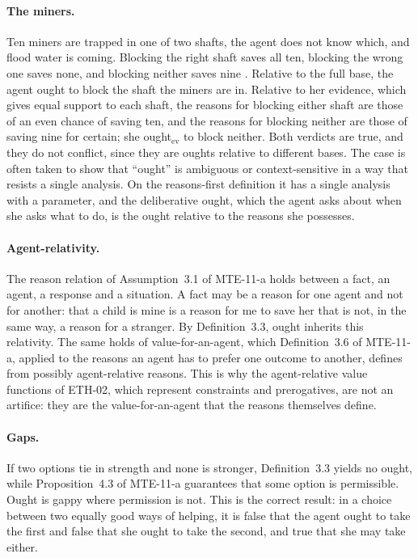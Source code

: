 \documentclass{situationist-preprint}
\begin{document}
\paragraph{The miners.} Ten miners are trapped in one of two shafts, the agent does not know which, and flood water is coming. Blocking the right shaft saves all ten, blocking the wrong one saves none, and blocking neither saves nine \citep{KolodnyMacFarlane2010}. Relative to the full base, the agent ought to block the shaft the miners are in. Relative to her evidence, which gives equal support to each shaft, the reasons for blocking either shaft are those of an even chance of saving ten, and the reasons for blocking neither are those of saving nine for certain; she ought$_{\mathrm{ev}}$ to block neither. Both verdicts are true, and they do not conflict, since they are oughts relative to different bases. The case is often taken to show that \enquote{ought} is ambiguous or context-sensitive in a way that resists a single analysis. On the reasons-first definition it has a single analysis with a parameter, and the deliberative ought, which the agent asks about when she asks what to do, is the ought relative to the reasons she possesses.

\paragraph{Agent-relativity.} The reason relation of Assumption~3.1 of MTE-11-a holds between a fact, an agent, a response and a situation. A fact may be a reason for one agent and not for another: that a child is mine is a reason for me to save her that is not, in the same way, a reason for a stranger. By Definition~3.3, ought inherits this relativity. The same holds of value-for-an-agent, which Definition~3.6 of MTE-11-a, applied to the reasons an agent has to prefer one outcome to another, defines from possibly agent-relative reasons. This is why the agent-relative value functions of ETH-02, which represent constraints and prerogatives, are not an artifice: they are the value-for-an-agent that the reasons themselves define.

\paragraph{Gaps.} If two options tie in strength and none is stronger, Definition~3.3 yields no ought, while Proposition~4.3 of MTE-11-a guarantees that some option is permissible. Ought is gappy where permission is not. This is the correct result: in a choice between two equally good ways of helping, it is false that the agent ought to take the first and false that she ought to take the second, and true that she may take either.
\end{document}
